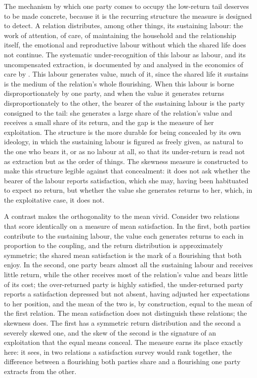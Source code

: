 The mechanism by which one party comes to occupy the low-return tail deserves to be made concrete, because it is the recurring structure the measure is designed to detect. A relation distributes, among other things, its sustaining labour: the work of attention, of care, of maintaining the household and the relationship itself, the emotional and reproductive labour without which the shared life does not continue. The systematic under-recognition of this labour as labour, and its uncompensated extraction, is documented by \textcite{hochschild1983} and analysed in the economics of care by \textcite{folbre2001}. This labour generates value, much of it, since the shared life it sustains is the medium of the relation's whole flourishing. When this labour is borne disproportionately by one party, and when the value it generates returns disproportionately to the other, the bearer of the sustaining labour is the party consigned to the tail: she generates a large share of the relation's value and receives a small share of its return, and the gap is the measure of her exploitation. The structure is the more durable for being concealed by its own ideology, in which the sustaining labour is figured as freely given, as natural to the one who bears it, or as no labour at all, so that its under-return is read not as extraction but as the order of things. The skewness measure is constructed to make this structure legible against that concealment: it does not ask whether the bearer of the labour reports satisfaction, which she may, having been habituated to expect no return, but whether the value she generates returns to her, which, in the exploitative case, it does not.

A contrast makes the orthogonality to the mean vivid. Consider two relations that score identically on a measure of mean satisfaction. In the first, both parties contribute to the sustaining labour, the value each generates returns to each in proportion to the coupling, and the return distribution is approximately symmetric; the shared mean satisfaction is the mark of a flourishing that both enjoy. In the second, one party bears almost all the sustaining labour and receives little return, while the other receives most of the relation's value and bears little of its cost; the over-returned party is highly satisfied, the under-returned party reports a satisfaction depressed but not absent, having adjusted her expectations to her position, and the mean of the two is, by construction, equal to the mean of the first relation. The mean satisfaction does not distinguish these relations; the skewness does. The first has a symmetric return distribution and the second a severely skewed one, and the skew of the second is the signature of an exploitation that the equal means conceal. The measure earns its place exactly here: it sees, in two relations a satisfaction survey would rank together, the difference between a flourishing both parties share and a flourishing one party extracts from the other.

